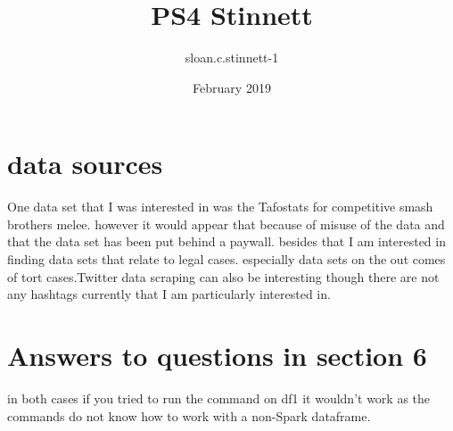\documentclass{article}
\title{PS4 Stinnett}
\author{sloan.c.stinnett-1 }
\date{February 2019}
\begin{document}
\maketitle
\section{data sources}
   One data set that I was interested in was the Tafostats for competitive smash brothers melee. however it would appear that because of misuse of the data and that the data set has been put behind a paywall. besides that I am interested in finding data sets that relate to legal cases. especially data sets on the out comes of tort cases.Twitter data scraping can also be interesting though there are not any hashtags currently that I am particularly interested in. 
 \section{Answers to questions in section 6}
   in both cases if you tried to run the command on df1 it wouldn't work as the commands do not know how to work with a non-Spark dataframe.
\end{document}
